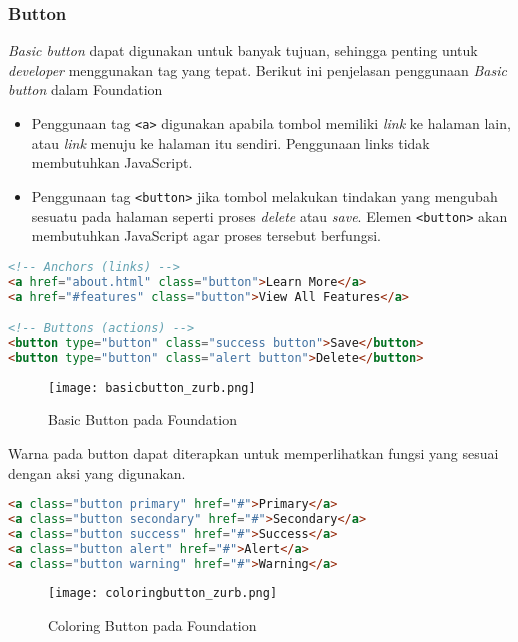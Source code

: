 \begin{itemize}
\subsubsection{Button}
\textit{Basic button} dapat digunakan untuk banyak tujuan, sehingga penting untuk \textit{developer} menggunakan tag yang tepat. Berikut ini penjelasan penggunaan \textit{Basic button} dalam Foundation
\begin{itemize}
  \item Penggunaan tag \texttt{<a>} digunakan apabila tombol memiliki \textit{link} ke halaman lain, atau \textit{link} menuju ke halaman itu sendiri. Penggunaan links tidak membutuhkan JavaScript.
  \item Penggunaan tag \texttt{<button>} jika tombol melakukan tindakan yang mengubah sesuatu pada halaman seperti proses \textit{delete} atau \textit{save}. Elemen \texttt{<button>} akan membutuhkan JavaScript agar proses tersebut berfungsi. 
\end{itemize}

\begin{lstlisting}[language=HTML, frame=single, basicstyle=\small] 
<!-- Anchors (links) -->
<a href="about.html" class="button">Learn More</a>
<a href="#features" class="button">View All Features</a>

<!-- Buttons (actions) -->
<button type="button" class="success button">Save</button>
<button type="button" class="alert button">Delete</button>
\end{lstlisting}

\begin{figure} [H]
	\centering  
	\texttt{[image: basicbutton\_zurb.png]}  
	\caption{Basic Button pada Foundation}
\end{figure}

\noindent Warna pada button dapat diterapkan untuk memperlihatkan fungsi yang sesuai dengan aksi yang digunakan.
\begin{lstlisting}[language=HTML, frame=single, basicstyle=\small] 
<a class="button primary" href="#">Primary</a>
<a class="button secondary" href="#">Secondary</a>
<a class="button success" href="#">Success</a>
<a class="button alert" href="#">Alert</a>
<a class="button warning" href="#">Warning</a>
\end{lstlisting}

\begin{figure} [H]
	\centering  
	\texttt{[image: coloringbutton\_zurb.png]}  
	\caption{Coloring Button pada Foundation}
\end{figure}


\end{itemize}
